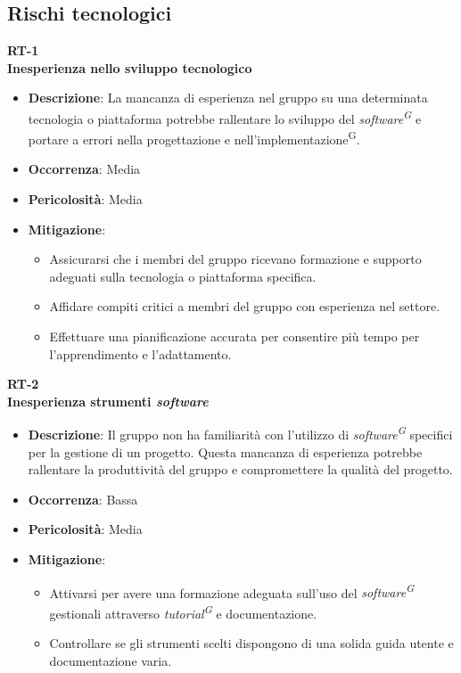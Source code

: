 \documentclass[5pt]{article}
\begin{document}
\subsection{Rischi tecnologici}
\textbf{RT-1} \\
\textbf{Inesperienza nello sviluppo tecnologico}
\begin{itemize}
  \item \textbf{Descrizione}: La mancanza di esperienza nel gruppo su una determinata tecnologia o piattaforma potrebbe rallentare lo sviluppo del \textit{software\textsuperscript{G}} e portare a errori nella progettazione e nell'implementazione\textsuperscript{G}.
  \item \textbf{Occorrenza}: Media
  \item \textbf{Pericolosità}: Media
  \item \textbf{Mitigazione}: 
    \begin{itemize}
      \item Assicurarsi che i membri del gruppo ricevano formazione e supporto adeguati sulla tecnologia o piattaforma specifica.
      \item Affidare compiti critici a membri del gruppo con esperienza nel settore.
      \item Effettuare una pianificazione accurata per consentire più tempo per l'apprendimento e l'adattamento.
      \end{itemize}
\end{itemize}
\textbf{RT-2} \\
\textbf{Inesperienza strumenti \textit{software}}
\begin{itemize}
  \item \textbf{Descrizione}: Il gruppo non ha familiarità con l'utilizzo di \textit{software\textsuperscript{G}} specifici per la gestione di un progetto. Questa mancanza di esperienza potrebbe rallentare la produttività del gruppo e compromettere la qualità del progetto.
  \item \textbf{Occorrenza}: Bassa
  \item \textbf{Pericolosità}: Media
  \item \textbf{Mitigazione}: 
    \begin{itemize}
      \item  Attivarsi per avere una formazione adeguata sull'uso del \textit{software\textsuperscript{G}} gestionali attraverso \textit{tutorial\textsuperscript{G}} e documentazione.
      \item Controllare se gli strumenti scelti dispongono di una solida guida utente e documentazione varia.
    \end{itemize}
\end{itemize}
\end{document}
